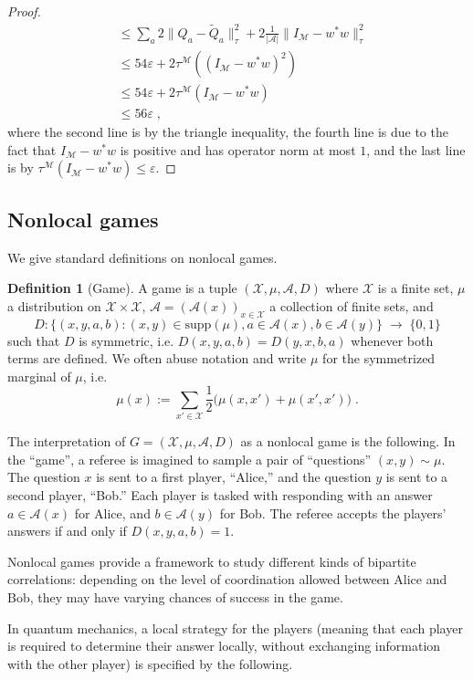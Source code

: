 \documentclass[11pt]{article}
\theoremstyle{definition}
\newtheorem{definition}[theorem]{Definition}
\newcommand{\mA}{\ensuremath{\mathcal{A}}}
\newcommand{\mM}{\ensuremath{\mathcal{M}}}
\newcommand{\mX}{\ensuremath{\mathcal{X}}}
\newcommand{\eps}{\varepsilon}
\begin{document}
\begin{proof}
\begin{align*}
&\leq  \sum_a 2\big\|{Q}_a - \tilde{Q}_a\big\|_\tau^2  + 2\frac{1}{|\mA|}\big\|I_\mM - w^* w\big\|_\tau^2 \\
&\leq 54 \eps + 2 \tau^\mM( (I_\mM - w^* w)^2 ) \\
&\leq 54 \eps + 2 \tau^\mM(I_\mM - w^* w ) \\
&\leq 56 \eps\;,
\end{align*}
where the second line is by the triangle inequality, the fourth line is due to the fact that $I_\mM - w^* w$ is positive and has operator norm at most $1$, and the last line is by $\tau^\mM(I_\mM - w^* w ) \leq \eps$.
\end{proof}

	
\subsection{Nonlocal games}

We give standard definitions on nonlocal games. 

\begin{definition}[Game]
A game is a tuple $(\mX,\mu,\mA,D)$ where $\mX$ is a finite set, $\mu$ a distribution on $\mX\times \mX$, $\mA=(\mA(x))_{x\in\mX}$ a collection of finite sets, and 
\[ D: \big\{ (x,y,a,b) : (x,y)\in\text{supp}(\mu),a\in\mA(x),b\in\mA(y)\big\} \;\to\;\{0,1\}\]
such that $D$ is symmetric, i.e. $D(x,y,a,b)=D(y,x,b,a)$ whenever both terms are defined. We often abuse notation and write $\mu$ for the symmetrized marginal of $\mu$, i.e.\ 
\[\mu(x) := \sum_{x'\in \mX} \frac{1}{2}\big(\mu(x,x')+\mu(x',x')\big)\;.\]
\end{definition}

The interpretation of $G=(\mX,\mu,\mA,D)$ as a nonlocal game is the following. In the ``game'', a referee is imagined to sample a pair of ``questions'' $(x,y)\sim \mu$. The question $x$ is sent to a first player, ``Alice,'' and the question $y$ is sent to a second player, ``Bob.'' Each player is tasked with responding with an answer $a\in \mA(x)$ for Alice, and $b\in \mA(y)$ for Bob. The referee accepts the players' answers if and only if $D(x,y,a,b)=1$. 

Nonlocal games provide a framework to study different kinds of bipartite correlations: depending on the level of coordination allowed between Alice and Bob, they may have varying chances of success in the game. 

In quantum mechanics, a local strategy for the players (meaning that each player is required to determine their answer locally, without exchanging information with the other player) is specified by the following. 
\end{document}
